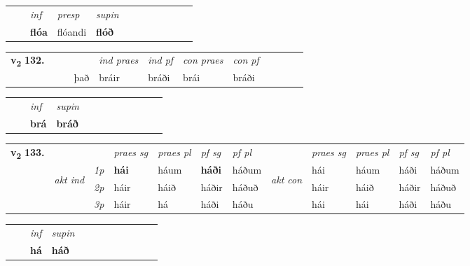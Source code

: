\begin{tabular}{llllllllllll}
 & & \textit{inf}     & \textit{presp} & \textit{supin}       \\*
  & & \textbf{flóa}      & flóandi &  \textbf{flóð}   \\*
\cmidrule{1-12}
\end{tabular}





\begin{tabular}{llllllllllll}\toprule
\multirow{4}{*}{{{\textbf{v{\textsubscript{2}}} \Large{\textbf{132.}}}}}  & &  & &  \textit{ind praes} & \textit{ind pf} & \textit{con praes} & \textit{con pf} \\*
&  & & það & bráir & bráði & brái & bráði \\*
\cmidrule{5-9}
\end{tabular}


\begin{tabular}{llllllllllll}
 & & \textit{inf}      & \textit{supin}       \\*
  & & \textbf{brá}       &  \textbf{bráð}   \\*
\cmidrule{1-12}
\end{tabular}



\begin{tabular}{llllllllllll} \toprule
\multirow{4}{*}{{{\textbf{v{\textsubscript{2}}} \Large{\textbf{133.}}}}}  & &   &  \textit{praes sg}  & \textit{praes pl}  &\textit{ pf sg} & \textit{pf pl} &  &  \textit{praes sg}  & \textit{praes pl}  & \textit{pf sg} & \textit{pf pl } \\*
	\cmidrule{4-7} \cmidrule{9-12}
 & \multirow{3}{*}{\begin{turn}{90}\textit{akt ind}\end{turn}} & {\textit{1p}} & \textbf{hái} & háum    & \textbf{háði} & háðum & \multirow{3}{*}{\begin{turn}{90}\textit{akt con}\end{turn}} &hái & háum & háði & háðum\\*
& &  {\textit{2p}} &  háir  & háið   & háðir & háðuð & & háir & háið & háðir & háðuð \\*
& &  {\textit{3p}} & háir & há   & háði & háðu & & hái & hái& háði & háðu  \\*
\cmidrule{4-7} \cmidrule{9-12}
\end{tabular}


\begin{tabular}{llllllllllll}
 & & \textit{inf}      & \textit{supin}       \\*
  & & \textbf{há}       &  \textbf{háð}   \\*
\cmidrule{1-12}
\end{tabular}



